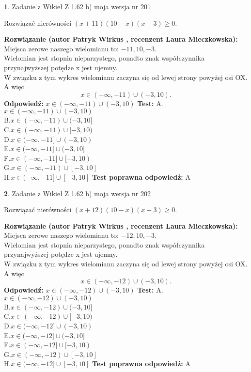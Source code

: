 \documentclass[12pt, a4paper]{article}
\theoremstyle{definition} %
\newtheorem{zad}{}
\newcommand{\zadStart}[1]{\begin{zad}#1\newline}
\newcommand{\zadStop}{\end{zad}}
\newcommand{\rozwStart}[2]{\noindent \textbf{Rozwiązanie (autor #1 , recenzent #2): }\newline}
\newcommand{\rozwStop}{\newline}
\newcommand{\odpStart}{\noindent \textbf{Odpowiedź:}\newline}
\newcommand{\odpStop}{\newline}
\newcommand{\testStart}{\noindent \textbf{Test:}\newline}
\newcommand{\testStop}{\newline}
\newcommand{\kluczStart}{\noindent \textbf{Test poprawna odpowiedź:}\newline}
\newcommand{\kluczStop}{\newline}
\begin{document}
\zadStart{Zadanie z Wikieł Z 1.62 b) moja wersja nr 201}

Rozwiązać nierówności $(x+11)(10-x)(x+3)\ge0$.
\zadStop
\rozwStart{Patryk Wirkus}{Laura Mieczkowska}
Miejsca zerowe naszego wielomianu to: $-11, 10, -3$.\\
Wielomian jest stopnia nieparzystego, ponadto znak współczynnika przy\linebreak najwyższej potędze x jest ujemny.\\ W związku z tym wykres wielomianu zaczyna się od lewej strony powyżej osi OX. A więc $$x \in (-\infty,-11) \cup (-3,10).$$
\rozwStop
\odpStart
$x \in (-\infty,-11) \cup (-3,10)$
\odpStop
\testStart
A.$x \in (-\infty,-11) \cup (-3,10)$\\
B.$x \in (-\infty,-11) \cup (-3,10]$\\
C.$x \in (-\infty,-11) \cup [-3,10)$\\
D.$x \in (-\infty,-11] \cup (-3,10)$\\
E.$x \in (-\infty,-11] \cup (-3,10]$\\
F.$x \in (-\infty,-11] \cup [-3,10)$\\
G.$x \in (-\infty,-11) \cup [-3,10]$\\
H.$x \in (-\infty,-11] \cup [-3,10]$
\testStop
\kluczStart
A
\kluczStop



\zadStart{Zadanie z Wikieł Z 1.62 b) moja wersja nr 202}

Rozwiązać nierówności $(x+12)(10-x)(x+3)\ge0$.
\zadStop
\rozwStart{Patryk Wirkus}{Laura Mieczkowska}
Miejsca zerowe naszego wielomianu to: $-12, 10, -3$.\\
Wielomian jest stopnia nieparzystego, ponadto znak współczynnika przy\linebreak najwyższej potędze x jest ujemny.\\ W związku z tym wykres wielomianu zaczyna się od lewej strony powyżej osi OX. A więc $$x \in (-\infty,-12) \cup (-3,10).$$
\rozwStop
\odpStart
$x \in (-\infty,-12) \cup (-3,10)$
\odpStop
\testStart
A.$x \in (-\infty,-12) \cup (-3,10)$\\
B.$x \in (-\infty,-12) \cup (-3,10]$\\
C.$x \in (-\infty,-12) \cup [-3,10)$\\
D.$x \in (-\infty,-12] \cup (-3,10)$\\
E.$x \in (-\infty,-12] \cup (-3,10]$\\
F.$x \in (-\infty,-12] \cup [-3,10)$\\
G.$x \in (-\infty,-12) \cup [-3,10]$\\
H.$x \in (-\infty,-12] \cup [-3,10]$
\testStop
\kluczStart
A
\kluczStop
\end{document}
